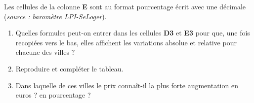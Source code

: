 \begin{exo}{}
	Les cellules de la colonne \textbf{E} sont au format pourcentage écrit avec une décimale (\textit{source : baromètre LPI-SeLoger}).
	\begin{enumerate}
		\item Quelles formules peut-on entrer dans les cellules \textbf{D3} et \textbf{E3} pour que, une fois recopiées vers le bas, elles affichent les variations absolue et relative pour chacune des villes ?
		\item Reproduire et compléter le tableau.
		\item Dans laquelle de ces villes le prix connaît-il la plus forte augmentation en euros ? en pourcentage ?
	\end{enumerate}
\end{exo}

